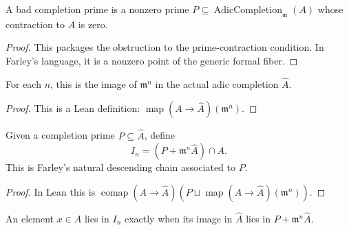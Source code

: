 \begin{definition}
  \label{def:adic_completion_bad_prime}
  A bad completion prime is a nonzero prime
  \(P\subseteq\operatorname{AdicCompletion}_{\mathfrak m}(A)\) whose
  contraction to \(A\) is zero.
\end{definition}

\begin{proof}
  This packages the obstruction to the prime-contraction condition.  In
  Farley's language, it is a nonzero point of the generic formal fiber.
\end{proof}

\begin{definition}
  \label{def:adic_completion_power_image}
  For each \(n\), this is the image of \(\mathfrak m^n\) in the actual
  adic completion \(\widehat A\).
\end{definition}

\begin{proof}
  This is a Lean definition:
  \(\operatorname{map}(A\to\widehat A)(\mathfrak m^n)\).
\end{proof}

\begin{definition}
  \label{def:bad_prime_contraction_chain}
  Given a completion prime \(P\subseteq\widehat A\), define
  \[
    I_n=(P+\mathfrak m^n\widehat A)\cap A.
  \]
  This is Farley's natural descending chain associated to \(P\).
\end{definition}

\begin{proof}
  In Lean this is
  \(\operatorname{comap}(A\to\widehat A)(P\sqcup
  \operatorname{map}(A\to\widehat A)(\mathfrak m^n))\).
\end{proof}

\begin{lemma}
  \label{lem:mem_bad_prime_contraction_chain}
  An element \(x\in A\) lies in \(I_n\) exactly when its image in
  \(\widehat A\) lies in \(P+\mathfrak m^n\widehat A\).
\end{lemma}

